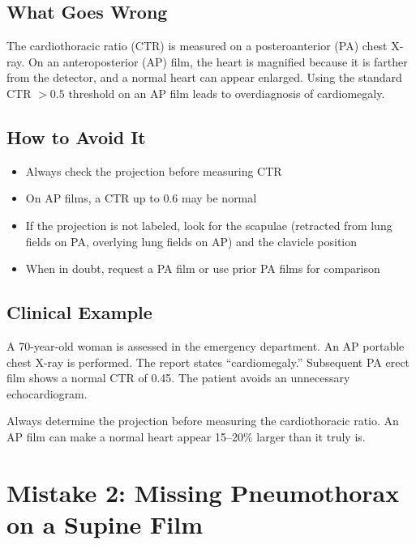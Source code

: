 \subsection{What Goes Wrong}
The cardiothoracic ratio (CTR) is measured on a posteroanterior (PA) chest X-ray. On an anteroposterior (AP) film, the heart is magnified because it is farther from the detector, and a normal heart can appear enlarged. Using the standard CTR $>0.5$ threshold on an AP film leads to overdiagnosis of cardiomegaly.

\subsection{How to Avoid It}
\begin{itemize}
    \item Always check the projection before measuring CTR
    \item On AP films, a CTR up to 0.6 may be normal
    \item If the projection is not labeled, look for the scapulae (retracted from lung fields on PA, overlying lung fields on AP) and the clavicle position
    \item When in doubt, request a PA film or use prior PA films for comparison
\end{itemize}

\subsection{Clinical Example}
A 70-year-old woman is assessed in the emergency department. An AP portable chest X-ray is performed. The report states ``cardiomegaly.'' Subsequent PA erect film shows a normal CTR of 0.45. The patient avoids an unnecessary echocardiogram.

\begin{pearlbox}
Always determine the projection before measuring the cardiothoracic ratio. An AP film can make a normal heart appear 15--20\% larger than it truly is.
\end{pearlbox}

\clearpage

\section{Mistake 2: Missing Pneumothorax on a Supine Film}

